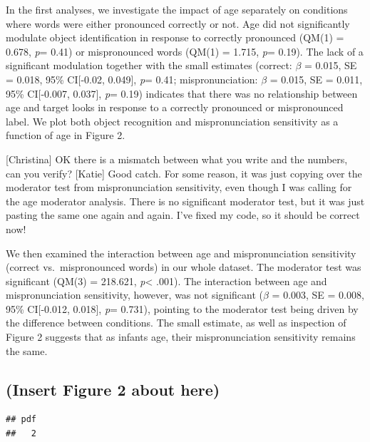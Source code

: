 \documentclass[man]{apa6}
\theoremstyle{definition}
\theoremstyle{definition}
\theoremstyle{definition}
\theoremstyle{remark}
\begin{document}
In the first analyses, we investigate the impact of age separately on
conditions where words were either pronounced correctly or not. Age did
not significantly modulate object identification in response to
correctly pronounced (QM(1) = 0.678, \emph{p}= 0.41) or mispronounced
words (QM(1) = 1.715, \emph{p}= 0.19). The lack of a significant
modulation together with the small estimates (correct: \(\beta\) =
0.015, SE = 0.018, 95\% CI{[}-0.02, 0.049{]}, \emph{p}= 0.41;
mispronunciation: \(\beta\) = 0.015, SE = 0.011, 95\% CI{[}-0.007,
0.037{]}, \emph{p}= 0.19) indicates that there was no relationship
between age and target looks in response to a correctly pronounced or
mispronounced label. We plot both object recognition and
mispronunciation sensitivity as a function of age in Figure 2.

{[}Christina{]} OK there is a mismatch between what you write and the
numbers, can you verify? {[}Katie{]} Good catch. For some reason, it was
just copying over the moderator test from mispronunciation sensitivity,
even though I was calling for the age moderator analysis. There is no
significant moderator test, but it was just pasting the same one again
and again. I've fixed my code, so it should be correct now!

We then examined the interaction between age and mispronunciation
sensitivity (correct vs.~mispronounced words) in our whole dataset. The
moderator test was significant (QM(3) = 218.621, \emph{p}\textless{}
.001). The interaction between age and mispronunciation sensitivity,
however, was not significant (\(\beta\) = 0.003, SE = 0.008, 95\%
CI{[}-0.012, 0.018{]}, \emph{p}= 0.731), pointing to the moderator test
being driven by the difference between conditions. The small estimate,
as well as inspection of Figure 2 suggests that as infants age, their
mispronunciation sensitivity remains the same.

\subsection{(Insert Figure 2 about
here)}\label{insert-figure-2-about-here}

\begin{verbatim}
## pdf 
##   2
\end{verbatim}
\end{document}
